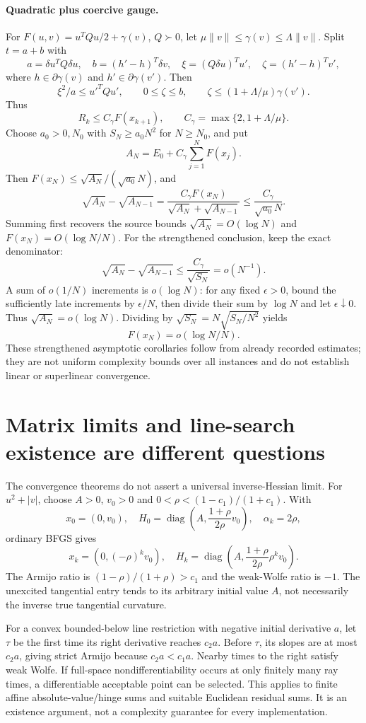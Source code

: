 \documentclass[10pt,oneside,openany]{book}
\theoremstyle{remark}\newtheorem{remark}{Remark}[chapter]
\begin{document}
\paragraph{Quadratic plus coercive gauge.}
For $F(u,v)=u^TQu/2+\gamma(v)$, $Q\succ0$, let $\mu\|v\|\le\gamma(v)\le\Lambda\|v\|$. Split $t=a+b$ with
\[
 a=\delta u^TQ\delta u,\quad b=(h'-h)^T\delta v,\quad
 \xi=(Q\delta u)^Tu',\quad\zeta=(h'-h)^Tv',
\]
where $h\in\partial\gamma(v)$ and $h'\in\partial\gamma(v')$. Then
\[
 \xi^2/a\le u'^TQu',\qquad0\le\zeta\le b,
 \qquad\zeta\le(1+\Lambda/\mu)\gamma(v').
\]
Thus
\[
 R_k\le C_\gamma F(x_{k+1}),\qquad
 C_\gamma=\max\{2,1+\Lambda/\mu\}.
\]
Choose $a_0>0,N_0$ with $S_N\ge a_0N^2$ for $N\ge N_0$, and put
\[
 A_N=E_0+C_\gamma\sum_{j=1}^NF(x_j).
\]
Then $F(x_N)\le\sqrt{A_N}/(\sqrt{a_0}N)$, and
\[
 \sqrt{A_N}-\sqrt{A_{N-1}}
 =\frac{C_\gamma F(x_N)}{\sqrt{A_N}+\sqrt{A_{N-1}}}
 \le\frac{C_\gamma}{\sqrt{a_0}N}.
\]
Summing first recovers the source bounds $\sqrt{A_N}=O(\log N)$ and $F(x_N)=O(\log N/N)$. For the strengthened conclusion, keep the exact denominator:
\[
 \sqrt{A_N}-\sqrt{A_{N-1}}\le \frac{C_\gamma}{\sqrt{S_N}}=o(N^{-1}).
\]
A sum of $o(1/N)$ increments is $o(\log N)$: for any fixed $\epsilon>0$, bound the sufficiently late increments by $\epsilon/N$, then divide their sum by $\log N$ and let $\epsilon\downarrow0$. Thus $\sqrt{A_N}=o(\log N)$. Dividing by $\sqrt{S_N}=N\sqrt{S_N/N^2}$ yields
\[
 \boxed{F(x_N)=o(\log N/N).}
\]
These strengthened asymptotic corollaries follow from already recorded estimates; they are not uniform complexity bounds over all instances and do not establish linear or superlinear convergence.

\section{Matrix limits and line-search existence are different questions}
The convergence theorems do not assert a universal inverse-Hessian limit. For $u^2+|v|$, choose $A>0$, $v_0>0$ and $0<\rho<(1-c_1)/(1+c_1)$. With
\[
 x_0=(0,v_0),\quad
 H_0=\operatorname{diag}\left(A,\frac{1+\rho}{2\rho}v_0\right),\quad\alpha_k=2\rho,
\]
ordinary BFGS gives
\[
 x_k=(0,(-\rho)^kv_0),\quad
 H_k=\operatorname{diag}\left(A,\frac{1+\rho}{2\rho}\rho^kv_0\right).
\]
The Armijo ratio is $(1-\rho)/(1+\rho)>c_1$ and the weak-Wolfe ratio is $-1$. The unexcited tangential entry tends to its arbitrary initial value $A$, not necessarily the inverse true tangential curvature.

For a convex bounded-below line restriction with negative initial derivative $a$, let $\tau$ be the first time its right derivative reaches $c_2a$. Before $\tau$, its slopes are at most $c_2a$, giving strict Armijo because $c_2a<c_1a$. Nearby times to the right satisfy weak Wolfe. If full-space nondifferentiability occurs at only finitely many ray times, a differentiable acceptable point can be selected. This applies to finite affine absolute-value/hinge sums and suitable Euclidean residual sums. It is an existence argument, not a complexity guarantee for every implementation.
\end{document}
